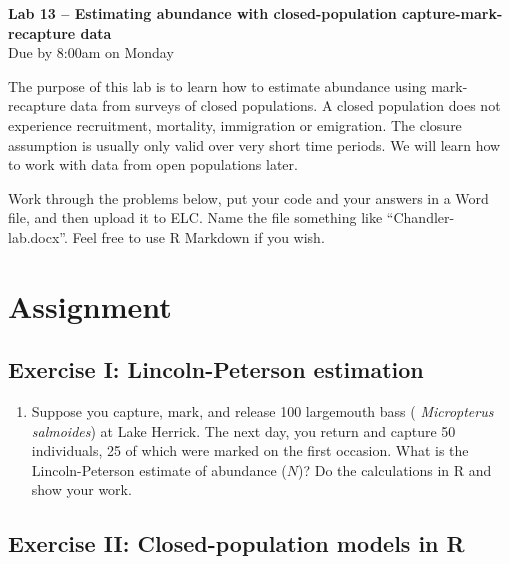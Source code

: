 \documentclass[12pt]{article}\usepackage[]{graphicx}\usepackage[]{xcolor}
\begin{document}
{
  \Large
  \centering
  {\bf Lab 13 -- Estimating abundance with closed-population capture-mark-recapture data \\ }
  Due by 8:00am on Monday \\
}

\vspace{10pt}


The purpose of this lab is to learn how to estimate abundance using
mark-recapture data from surveys of closed populations. A closed
population does not experience recruitment, mortality, immigration or
emigration. The closure assumption is usually only valid over very
short time periods. We will learn how to work with data from open
populations later.

Work through the problems below, put your code and your answers in a
Word file, and then upload it to ELC. Name the file something like 
``Chandler-lab.docx''. Feel free to use R Markdown if you wish.

\vspace{-6pt}

\section*{Assignment}

\subsection*{Exercise I: Lincoln-Peterson estimation}

\begin{enumerate}
  \item Suppose you capture, mark, and release 100 largemouth bass ({\it
      Micropterus salmoides}) at Lake Herrick. The next day, you return
    and capture 50 individuals, 25 of which were marked on the first
    occasion. What is the Lincoln-Peterson estimate of abundance ($N$)?
    Do the calculations in R and show your work.
\end{enumerate}



\subsection*{Exercise II: Closed-population models in R}
\end{document}
